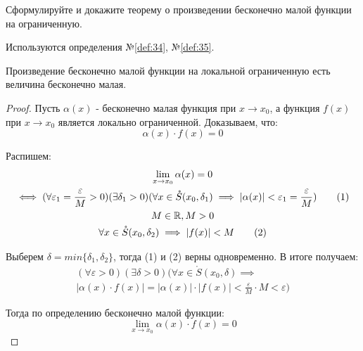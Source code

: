 \begin{question}
    Сформулируйте и докажите теорему о произведении бесконечно малой функции на ограниченную.
\end{question}
\begin{used}
    Используются определения №\ref{def:34}, №\ref{def:35}.
\end{used}
\begin{theorem}
    Произведение бесконечно малой функции на локальной ограниченную есть величина бесконечно малая.
\end{theorem}
\begin{proof}
    Пусть $\alpha(x)$ - бесконечно малая функция при $x \to x_0$, а функция $f(x)$ при $x \to  x_0$ является локально ограниченной. Доказываем, что: \[
        \alpha(x) \cdot f(x) = 0
    \] 

    Распишем:
    \begin{gather*}
        \lim_{x \to x_0} \alpha(x) = 0 \\
        \iff (\forall \varepsilon_1 = \frac{\varepsilon}{M} > 0)(\exists \delta_1 > 0)(\forall x \in \mathring{S}(x_0, \delta_1) \implies |\alpha(x)| < \varepsilon_1 = \frac{\varepsilon}{M}) \tag{1}\\
        M \in \mathbb{R}, M > 0 \\
        \forall x \in  \mathring{S}(x_0, \delta_2) \implies |f(x)| < M \tag{2} \\ 
    \end{gather*}

    Выберем $\delta = min \{\delta_1, \delta_2\} $, тогда (1) и (2) верны одновременно. В итоге получаем:
    \begin{gather*}
        (\forall \varepsilon > 0)(\exists \delta > 0)(\forall x \in \mathring{S}(x_0, \delta) \implies \\
        |\alpha(x) \cdot f(x)| = |\alpha(x)| \cdot |f(x)| < \frac{\varepsilon}{M} \cdot M < \varepsilon)  
    \end{gather*}

    Тогда по определению бесконечно малой функции: \[
        \lim_{x \to x_0} \alpha(x) \cdot f(x) = 0
    \] 
\end{proof}
\pagebreak



